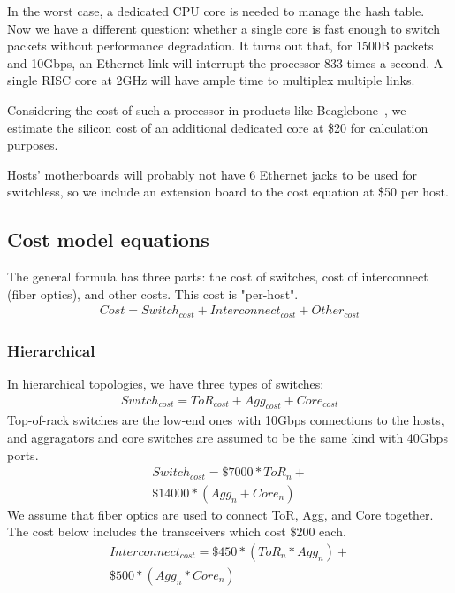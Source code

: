 In the worst case, a dedicated CPU core is needed to manage the hash table. Now we have a different question: whether a single core is fast enough to switch packets without performance degradation. It turns out that, for 1500B packets and 10Gbps, an Ethernet link will interrupt the processor 833 times a second. A single RISC core at 2GHz will have ample time to multiplex multiple links.

Considering the cost of such a processor in products like Beaglebone~\cite{FIXME}, we estimate the silicon cost of an additional dedicated core at \$20 for calculation purposes.

Hosts' motherboards will probably not have 6 Ethernet jacks to be used for switchless, so we include an extension board to the cost equation at \$50 per host.

\subsection{Cost model equations}
The general formula has three parts: the cost of switches, cost of interconnect (fiber optics), and other costs. This cost is "per-host".
\begin{multline}
Cost = Switch_{cost} + Interconnect_{cost} + Other_{cost}
\end{multline}

\subsubsection{Hierarchical}
In hierarchical topologies, we have three types of switches:
\begin{multline}
Switch_{cost} = ToR_{cost} + Agg_{cost} + Core_{cost}
\end{multline}
Top-of-rack switches are the low-end ones with 10Gbps connections to the hosts, and aggragators and core switches are assumed to be the same kind with 40Gbps ports.
\begin{multline}
Switch_{cost} = \$7000 * ToR_n +\\
                \$14000 * (Agg_n + Core_n)
\end{multline}
We assume that fiber optics are used to connect ToR, Agg, and Core together. The cost below includes the transceivers which cost \$200 each.
\begin{multline}
Interconnect_{cost} = \$450 * (ToR_n * Agg_n) +\\
                      \$500 * (Agg_n * Core_n)
\end{multline}

